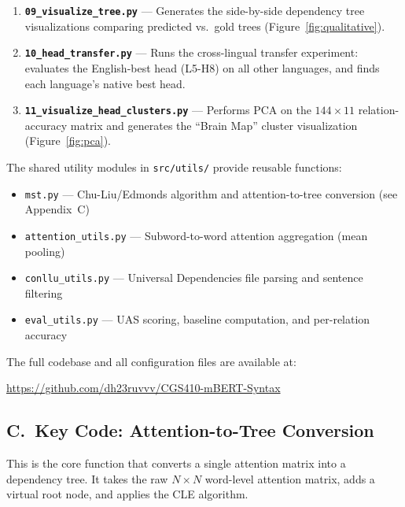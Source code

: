 \documentclass[11pt, a4paper]{article}
\begin{document}
\begin{enumerate}
    \item \textbf{\texttt{09\_visualize\_tree.py}} --- Generates the side-by-side dependency tree visualizations comparing predicted vs.\ gold trees (Figure~\ref{fig:qualitative}).
    \item \textbf{\texttt{10\_head\_transfer.py}} --- Runs the cross-lingual transfer experiment: evaluates the English-best head (L5-H8) on all other languages, and finds each language's native best head.
    \item \textbf{\texttt{11\_visualize\_head\_clusters.py}} --- Performs PCA on the $144 \times 11$ relation-accuracy matrix and generates the ``Brain Map'' cluster visualization (Figure~\ref{fig:pca}).
\end{enumerate}

\noindent The shared utility modules in \texttt{src/utils/} provide reusable functions:
\begin{itemize}\setlength\itemsep{1pt}
    \item \texttt{mst.py} --- Chu-Liu/Edmonds algorithm and attention-to-tree conversion (see Appendix~C)
    \item \texttt{attention\_utils.py} --- Subword-to-word attention aggregation (mean pooling)
    \item \texttt{conllu\_utils.py} --- Universal Dependencies file parsing and sentence filtering
    \item \texttt{eval\_utils.py} --- UAS scoring, baseline computation, and per-relation accuracy
\end{itemize}

\noindent The full codebase and all configuration files are available at:
\begin{center}
\url{https://github.com/dh23ruvvv/CGS410-mBERT-Syntax}
\end{center}

\subsection*{C.\ Key Code: Attention-to-Tree Conversion}

This is the core function that converts a single attention matrix into a dependency tree. It takes the raw $N \times N$ word-level attention matrix, adds a virtual root node, and applies the CLE algorithm.
\end{document}
